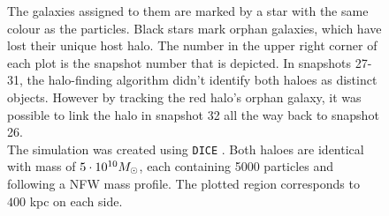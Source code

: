 \begin{figure}[!htbp]
{        The galaxies assigned to them are marked by a star with the same colour as the particles.
        Black stars mark orphan galaxies, which have lost their unique host halo.
        The number in the upper right corner of each plot is the snapshot number that is depicted.
        In snapshots 27-31, the halo-finding algorithm didn't identify both haloes as distinct objects.
        However by tracking the red halo's orphan galaxy, it was possible to link the halo in snapshot 32 all the way back to snapshot 26.\\        
        The simulation was created using \texttt{DICE} \parencite{DICE}.
        Both haloes are identical with mass of $5\cdot 10^{10}M_\odot$, each containing 5000 particles and following a NFW mass profile.
        The plotted region corresponds to $400$ kpc on each side.
        }
\end{figure}




























































